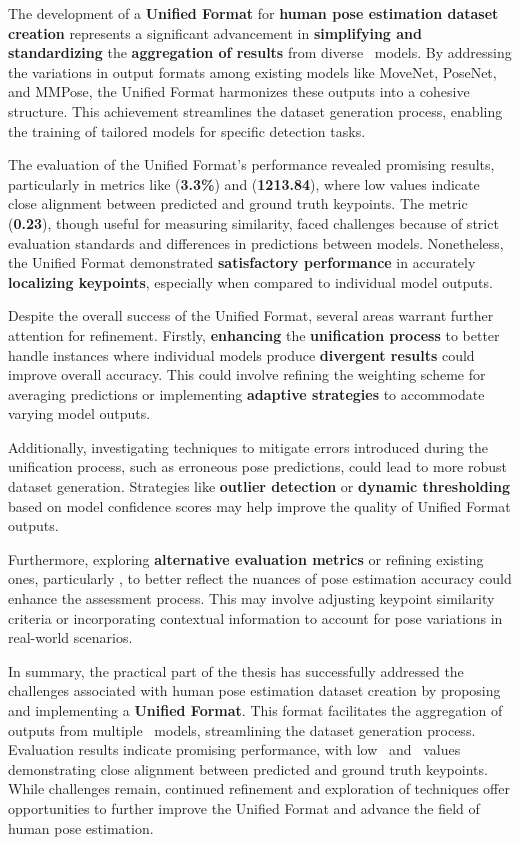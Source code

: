 The development of a {\bf Unified Format} for {\bf human pose estimation dataset creation} represents a significant advancement in {\bf simplifying and standardizing} the {\bf aggregation of results} from diverse \NN\ models. By addressing the variations in output formats among existing models like MoveNet, PoseNet, and MMPose, the Unified Format harmonizes these outputs into a cohesive structure. This achievement streamlines the dataset generation process, enabling the training of tailored models for specific detection tasks.

The evaluation of the Unified Format's performance revealed promising results, particularly in metrics like {\bf \APE} ({\bf 3.3\%}) and {\bf \MSE} ({\bf 1213.84}), where low values indicate close alignment between predicted and ground truth keypoints. The {\bf \OKS} metric ({\bf 0.23}), though useful for measuring similarity, faced challenges because of strict evaluation standards and differences in predictions between models. Nonetheless, the Unified Format demonstrated {\bf satisfactory performance} in accurately {\bf localizing keypoints}, especially when compared to individual model outputs.

Despite the overall success of the Unified Format, several areas warrant further attention for refinement. Firstly, {\bf enhancing} the {\bf unification process} to better handle instances where individual models produce {\bf divergent results} could improve overall accuracy. This could involve refining the weighting scheme for averaging predictions or implementing {\bf adaptive strategies} to accommodate varying model outputs.

Additionally, investigating techniques to mitigate errors introduced during the unification process, such as erroneous pose predictions, could lead to more robust dataset generation. Strategies like {\bf outlier detection} or {\bf dynamic thresholding} based on model confidence scores may help improve the quality of Unified Format outputs.

Furthermore, exploring {\bf alternative evaluation metrics} or refining existing ones, particularly {\bf \OKS}, to better reflect the nuances of pose estimation accuracy could enhance the assessment process. This may involve adjusting keypoint similarity criteria or incorporating contextual information to account for pose variations in real-world scenarios.

In summary, the practical part of the thesis has successfully addressed the challenges associated with human pose estimation dataset creation by proposing and implementing a {\bf Unified Format}. This format facilitates the aggregation of outputs from multiple \NN\ models, streamlining the dataset generation process. Evaluation results indicate promising performance, with low \APE\ and \MSE\ values demonstrating close alignment between predicted and ground truth keypoints. While challenges remain, continued refinement and exploration of techniques offer opportunities to further improve the Unified Format and advance the field of human pose estimation.
